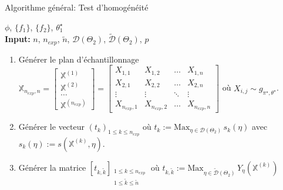\documentclass{article}
\begin{document}
                \begin{algorithm}[h!]
                \caption{Algorithme général: Test d'homogénéité}
                    \Apriori $\phi$, $\{f_1\}$, $\{f_2\}$, $\theta_1^\star$ \\
                    \vspace*{0.2cm}
                    \textbf{Input:} $n$, $n_{exp}$, $\tilde{n}$, $\mathcal{D}(\Theta_2)$, $\tilde{\mathcal{D}}(\Theta_2)$, $p$ \\
                    \begin{enumerate}
                        \item Générer le plan d'échantillonnage $\mathbb{X}_{n_{exp},n} = 
                        \begin{bmatrix}
                            \mathbb{X}^{(1)} \\
                            \mathbb{X}^{(2)} \\
                            \ldots \\
                            \mathbb{X}^{(n_{exp})}
                        \end{bmatrix} =
                        \begin{bmatrix}
                            X_{1,1} & X_{1,2} & \ldots & X_{1,n} \\
                            X_{2,1} & X_{2,2} & \ldots & X_{2,n} \\
                            \vdots  & \vdots  & \ddots & \vdots  \\
                            X_{n_{exp},1} & X_{n_{exp},2} & \ldots & X_{n_{exp},n}
                        \end{bmatrix}$ 
                        où $X_{i,j} \sim g_{\pi^\star,\theta^\star}$. \hfill \break       
                        \item Générer le vecteur $(t_k)_{1\leq k\leq n_{exp}}$ où $t_k := \textrm{Max}_{\eta\in\mathcal{D}(\Theta_2)}\, s_k(\eta)$ avec $s_k(\eta) := s(\mathbb{X}^{(k)},\eta)$. \vspace*{0.2cm}
                        \item Générer la matrice $[t_{k,\tilde{k}}]_{\substack{1\leq k\leq n_{exp} \\ 1\leq\tilde{k}\leq\tilde{n}}}$ où $t_{k,\tilde{k}}:=\mathrm{Max}_{\eta\in\tilde{\mathcal{D}}(\Theta_2)}\,Y_\eta(\mathbb{X}^{(k)})$
                    \end{enumerate}
                    \begin{flushright}

\end{flushright}
\end{algorithm}
\end{document}
